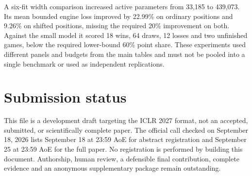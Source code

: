 \documentclass{article}
\begin{document}
A six-fit width comparison increased active parameters from 33,185 to 439,073.
Its mean bounded engine loss improved by 22.99\% on ordinary positions and
9.26\% on shifted positions, missing the required 20\% improvement on both.
Against the small model it scored 18 wins, 64 draws, 12 losses and two unfinished
games, below the required lower-bound 60\% point share. These experiments used
different panels and budgets from the main tables and must not be pooled into
a single benchmark or used as independent replications.



\section{Submission status}
This file is a development draft targeting the ICLR 2027 format, not an accepted,
submitted, or scientifically complete paper. The official call checked on
September 18, 2026 lists September 18 at 23:59 AoE for abstract registration and
September 25 at 23:59 AoE for the full paper. No registration is performed by
building this document. Authorship, human review, a defensible final contribution,
complete evidence and an anonymous supplementary package remain outstanding.
\end{document}
